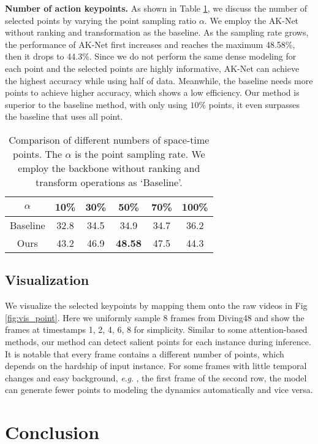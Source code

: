 \documentclass[journal]{IEEEtran}
\newcommand{\eg}{\textit{e}.\textit{g}. }
\begin{document}
\textbf{Number of action keypoints.}
As shown in Table \ref{tab:point_rate}, we discuss the number of selected points by varying the point sampling ratio $\alpha$.
We employ the AK-Net without ranking and transformation as the baseline.
As the sampling rate grows, the performance of AK-Net first increases and reaches the maximum 48.58\%, then it drops to 44.3\%.
Since we do not perform the same dense modeling for each point and the selected points are highly informative, AK-Net can achieve the highest accuracy while using half of data.
Meanwhile, the baseline needs more points to achieve higher accuracy, which shows a low efficiency.
Our method is superior to the baseline method, with only using $10\%$ points, it even surpasses the baseline that uses all point.

\begin{table}[ht]
    \centering
    \caption{Comparison of different numbers of space-time points.
    The $\alpha$ is the point sampling rate.
    We employ the backbone without ranking and transform operations as `Baseline'.
    }
    \label{tab:point_rate}
	\begin{tabular}{cccccc} \hline
		$\alpha$ & 10\%   & 30\%   & 50\%    & 70\%   & 100\%  \\ \hline
		Baseline & 32.8    & 34.5 & 34.9  & 34.7 & 36.2   \\
		Ours       & 43.2 & 46.9 & \textbf{48.58} & 47.5 & 44.3 \\ \hline
	\end{tabular}
\end{table}

\subsection{Visualization}
We visualize the selected keypoints by mapping them onto the raw videos in Fig \ref{fig:vis_point}.
Here we uniformly sample 8 frames from Diving48 and show the frames at timestamps 1, 2, 4, 6, 8 for simplicity.
Similar to some attention-based methods, our method can detect salient points for each instance during inference.
It is notable that every frame contains a different number of points, which depends on the hardship of input instance.
For some frames with little temporal changes and easy background, \eg, the first frame of the second row, the model can generate fewer points to modeling the dynamics automatically and vice versa.

\section{Conclusion}\label{sec:conclusion}
\end{document}
